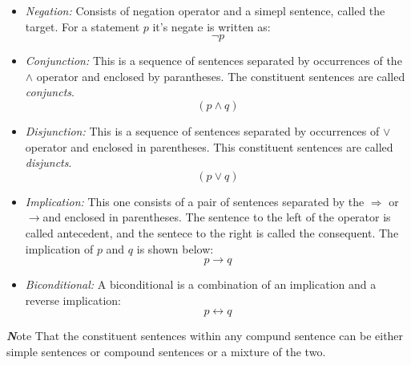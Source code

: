 \documentclass[10pt,a4pape,twocolumn]{article}
\newenvironment{callout}
	{\begin{calloutbox}\color{charcoal}\textbf\textit}
	{\end{calloutbox}}
\begin{document}
                \begin{itemize}
                        \item \textit{Negation:} Consists of negation operator and a simepl sentence, called the target. For a statement $p$ it's negate is written as:
                        \begin{equation}
                            \neg p
                        \end{equation}
                        \item \textit{Conjunction:} This is a sequence of sentences separated by occurrences of the $\land$ operator and enclosed by parantheses. The constituent sentences are called \textit{conjuncts}.
                        \begin{equation}
                            \left(p\land q\right)
                        \end{equation}
                        \item \textit{Disjunction:} This is a sequence of sentences separated by occurrences of $\lor$ operator and enclosed in parentheses. This constituent sentences are called \textit{disjuncts}.  
                        \begin{equation}
                            \left(p\lor q\right)
                        \end{equation}
                        \item \textit{Implication:} This one consists of a pair of sentences separated by the $\Rightarrow$ or $\rightarrow$and enclosed in parentheses. The sentence to the left of the operator is called antecedent, and the sentece to the right is called the consequent. The implication of $p$ and $q$ is shown below:
                        \begin{equation}
                            p\rightarrow q
                        \end{equation}
                        \item \textit{Biconditional:} A biconditional is a combination of an implication and a reverse implication:
                        \begin{equation}
                            p\leftrightarrow q
                        \end{equation}
                \end{itemize}
                \begin{callout}
                        Note That the constituent sentences within any compund sentence can be either simple sentences or compound sentences or a mixture of the two.
                \end{callout}
\end{document}
